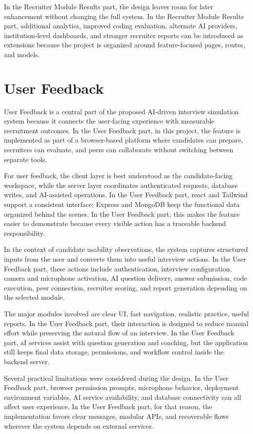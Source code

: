\documentclass[12pt,a4paper]{report}
\begin{document}
In the Recruiter Module Results part, the design leaves room for later enhancement without changing the full system. In the Recruiter Module Results part, additional analytics, improved coding evaluation, alternate AI providers, institution-level dashboards, and stronger recruiter reports can be introduced as extensions because the project is organized around feature-focused pages, routes, and models.


\section{User Feedback}

User Feedback is a central part of the proposed AI-driven interview simulation system because it connects the user-facing experience with measurable recruitment outcomes. In the User Feedback part, in this project, the feature is implemented as part of a browser-based platform where candidates can prepare, recruiters can evaluate, and peers can collaborate without switching between separate tools.


For user feedback, the client layer is best understood as the candidate-facing workspace, while the server layer coordinates authenticated requests, database writes, and AI-assisted operations. In the User Feedback part, react and Tailwind support a consistent interface; Express and MongoDB keep the functional data organized behind the scenes. In the User Feedback part, this makes the feature easier to demonstrate because every visible action has a traceable backend responsibility.


In the context of candidate usability observations, the system captures structured inputs from the user and converts them into useful interview actions. In the User Feedback part, these actions include authentication, interview configuration, camera and microphone activation, AI question delivery, answer submission, code execution, peer connection, recruiter scoring, and report generation depending on the selected module.


The major modules involved are clear UI, fast navigation, realistic practice, useful reports. In the User Feedback part, their interaction is designed to reduce manual effort while preserving the natural flow of an interview. In the User Feedback part, aI services assist with question generation and coaching, but the application still keeps final data storage, permissions, and workflow control inside the backend server.


Several practical limitations were considered during the design. In the User Feedback part, browser permission prompts, microphone behavior, deployment environment variables, AI service availability, and database connectivity can all affect user experience. In the User Feedback part, for that reason, the implementation favors clear messages, modular APIs, and recoverable flows wherever the system depends on external services.
\end{document}
